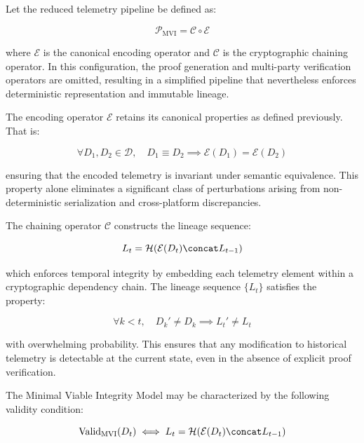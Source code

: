 Let the reduced telemetry pipeline be defined as:

\begin{equation}
\mathcal{P}_{\text{MVI}} = \mathcal{C} \circ \mathcal{E}
\end{equation}

where $\mathcal{E}$ is the canonical encoding operator and $\mathcal{C}$ is the cryptographic chaining operator. In this configuration, the proof generation and multi-party verification operators are omitted, resulting in a simplified pipeline that nevertheless enforces deterministic representation and immutable lineage.

The encoding operator $\mathcal{E}$ retains its canonical properties as defined previously. That is:

\begin{equation}
\forall D_1, D_2 \in \mathcal{D}, \quad D_1 \equiv D_2 \implies \mathcal{E}(D_1) = \mathcal{E}(D_2)
\end{equation}

ensuring that the encoded telemetry is invariant under semantic equivalence. This property alone eliminates a significant class of perturbations arising from non-deterministic serialization and cross-platform discrepancies.

The chaining operator $\mathcal{C}$ constructs the lineage sequence:

\begin{equation}
L_t = \mathcal{H}(\mathcal{E}(D_t) \concat L_{t-1})
\end{equation}

which enforces temporal integrity by embedding each telemetry element within a cryptographic dependency chain. The lineage sequence $\{L_t\}$ satisfies the property:

\begin{equation}
\forall k < t, \quad D_k' \neq D_k \implies L_t' \neq L_t
\end{equation}

with overwhelming probability. This ensures that any modification to historical telemetry is detectable at the current state, even in the absence of explicit proof verification.

The Minimal Viable Integrity Model may be characterized by the following validity condition:

\begin{equation}
\text{Valid}_{\text{MVI}}(D_t) \iff L_t = \mathcal{H}(\mathcal{E}(D_t) \concat L_{t-1})
\end{equation}

